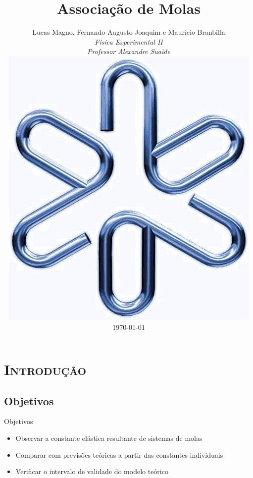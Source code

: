 \documentclass[xcolor=x11names,compress]{beamer}
\renewcommand{\(}{\begin{columns}}
\renewcommand{\)}{\end{columns}}
\newcommand{\<}[1]{\begin{column}{#1}}
\renewcommand{\>}{\end{column}}
\begin{document}
\section{\scshape Introdução}
\begin{frame}
\title{\LARGE Associação de Molas}
\author{
	Lucas Magno, Fernando Augusto Joaquim e Maurício Branbilla\\[0.2cm]
	{\it \footnotesize Física Experimental II 	\\Professor Alexandre Suaide}\\[0.3cm]
	\includegraphics[scale=0.2]{logo_if_azul}\\[0.5cm]
	\today	
}
\titlepage
\end{frame}


\subsection{Objetivos}

\begin{frame}{Objetivos}
	\begin{itemize}
		\item Observar a constante elástica resultante de sistemas de molas
		\item Comparar com previsões teóricas a partir das constantes individuais
		\item Verificar o intervalo de validade do modelo teórico
	\end{itemize}
\end{frame}
\end{document}

